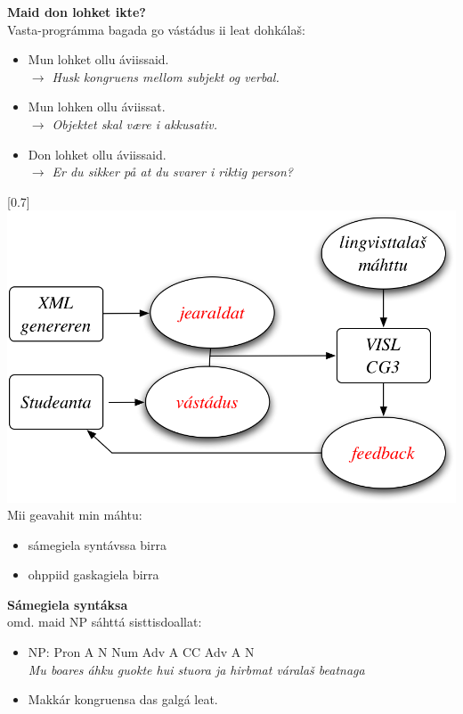 \documentclass[landscape,norsk,11pt]{seminar}
\begin{document}
\begin{slide}
\newslide
\textbf{Maid don lohket ikte?}\\
Vasta-prográmma bagada go vástádus ii leat dohkálaš:
\begin{itemize}
\item Mun lohket ollu \'aviissaid. \\ \textit{$\rightarrow$  Husk kongruens mellom subjekt og verbal.}
\item Mun lohken ollu \'aviissat. \\ \textit{$\rightarrow$ Objektet skal være i akkusativ.}
\item Don lohket ollu \'aviissaid. \\ \textit{$\rightarrow$ Er du sikker på at du svarer i riktig person?}
\end{itemize}

\scalebox{0.7}[0.7]{\includegraphics{img/skovi.png}} 
\newslide
Mii geavahit min máhtu:
\begin{itemize}
\item sámegiela syntávssa birra		
\item ohppiid gaskagiela birra
\end{itemize}

\newslide
\textbf{Sámegiela syntáksa}\\
omd. maid NP sáhttá sisttisdoallat:
\begin{itemize}
\item \small{NP: Pron A N Num Adv A CC Adv A N}  \\ 	
\textit{Mu boares áhku guokte hui stuora ja hirbmat váralaš beatnaga}	
\item Makkár kongruensa das galgá leat.
\end{itemize}




\end{slide}
\end{document}
